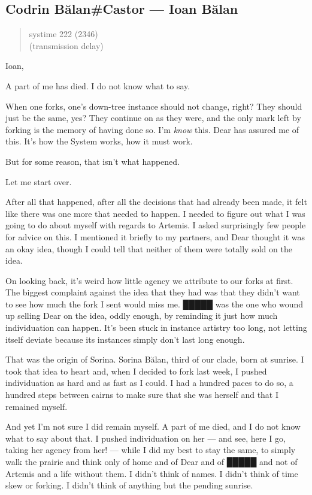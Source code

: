 \hypertarget{codrin-bux103lancastor-ioan-bux103lan}{%
\subsection{Codrin Bălan\#Castor — Ioan Bălan}\label{codrin-bux103lancastor-ioan-bux103lan}}

\begin{quote}
systime 222 (2346)\\
(transmission delay)
\end{quote}

Ioan,

A part of me has died. I do not know what to say.

When one forks, one's down-tree instance should not change, right? They should just be the same, yes? They continue on as they were, and the only mark left by forking is the memory of having done so. I'm \emph{know} this. Dear has assured me of this. It's how the System works, how it must work.

But for some reason, that isn't what happened.

Let me start over.

After all that happened, after all the decisions that had already been made, it felt like there was one more that needed to happen. I needed to figure out what I was going to do about myself with regards to Artemis. I asked surprisingly few people for advice on this. I mentioned it briefly to my partners, and Dear thought it was an okay idea, though I could tell that neither of them were totally sold on the idea.

On looking back, it's weird how little agency we attribute to our forks at first. The biggest complaint against the idea that they had was that they didn't want to see how much the fork I sent would miss me. █████ was the one who wound up selling Dear on the idea, oddly enough, by reminding it just how much individuation can happen. It's been stuck in instance artistry too long, not letting itself deviate because its instances simply don't last long enough.

That was the origin of Sorina. Sorina Bălan, third of our clade, born at sunrise. I took that idea to heart and, when I decided to fork last week, I pushed individuation as hard and as fast as I could. I had a hundred paces to do so, a hundred steps between cairns to make sure that she was herself and that I remained myself.

And yet I'm not sure I did remain myself. A part of me died, and I do not know what to say about that. I pushed individuation on her — and see, here I go, taking her agency from her! — while I did my best to stay the same, to simply walk the prairie and think only of home and of Dear and of █████ and not of Artemis and a life without them. I didn't think of names. I didn't think of time skew or forking. I didn't think of anything but the pending sunrise.

